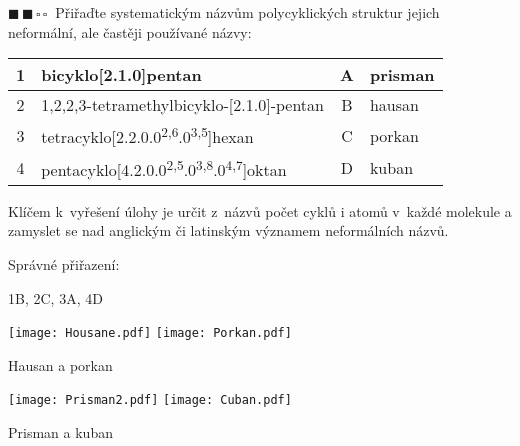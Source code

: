 \documentclass{book}
\newcommand{\dva}{$\blacksquare \, \blacksquare \, \square \, \square \; \; $}
\renewenvironment{quotation}{\par}{\par} %
\begin{document}
\hrulefill %
\begin{quotation}
\dva Přiřaďte systematickým názvům polycyklických struktur jejich neformální,
ale častěji používané názvy:
\end{quotation} \dotfill \par 
\begin{center}
\begin{tabular}{c|l||c|l}
1 & bicyklo{[}2.1.0{]}pentan & A & prisman \\\hline
2 & 1,2,2,3-tetramethylbicyklo-{[}2.1.0{]}-pentan & B & hausan \\\hline
3 & tetracyklo{[}2.2.0.0\textsuperscript{2,6}.0\textsuperscript{3,5}{]}hexan & C & porkan \\\hline
4 & pentacyklo{[}4.2.0.0\textsuperscript{2,5}.0\textsuperscript{3,8}.0\textsuperscript{4,7}{]}oktan & D & kuban \\
\end{tabular}
\end{center}
Klíčem k~vyřešení úlohy je určit z~názvů počet cyklů i atomů v~každé
molekule a zamyslet se nad anglickým či latinským významem neformálních
názvů. 

Správné přiřazení:

1B, 2C, 3A, 4D
\noindent \begin{center}

\noindent \begin{centering}
\texttt{[image: Housane.pdf]}\hspace{2cm}
\texttt{[image: Porkan.pdf]}
\par\end{centering}
Hausan a porkan

\par\end{center}

\noindent \begin{center}

\noindent \begin{centering}
\texttt{[image: Prisman2.pdf]}\hspace{1.5cm}
\texttt{[image: Cuban.pdf]}
\par\end{centering}
Prisman a kuban

\par\end{center}
\end{document}
